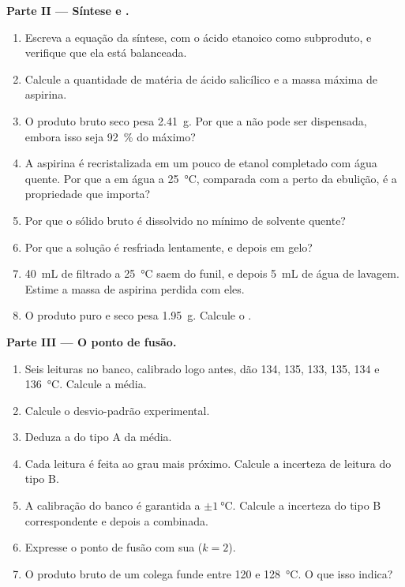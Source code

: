 \begin{problem}
\noindent\textbf{Parte II --- Síntese e .}
\begin{enumerate}[resume]
  \item Escreva a equação da síntese, com o ácido etanoico 
        como subproduto, e verifique que ela está balanceada.
  \item Calcule a quantidade de matéria de ácido salicílico e a massa
        máxima de aspirina.
  \item O produto bruto seco pesa \qty{2.41}{g}. Por que a
         não pode ser dispensada, embora isso seja
        \qty{92}{\percent} do máximo?
  \item A aspirina é recristalizada em um pouco de etanol completado com
        água quente. Por que a  em água a \qty{25}{\celsius},
        comparada com a  perto da ebulição, é a propriedade que importa?
  \item Por que o sólido bruto é dissolvido no mínimo de solvente quente?
  \item Por que a solução é resfriada lentamente, e depois em gelo?
  \item \qty{40}{mL} de filtrado a \qty{25}{\celsius} saem do funil, e
        depois \qty{5}{mL} de água de lavagem. Estime a massa de aspirina
        perdida com eles.
  \item O produto puro e seco pesa \qty{1.95}{g}. Calcule o .
\end{enumerate}

\noindent\textbf{Parte III --- O ponto de fusão.}
\begin{enumerate}[resume]
  \item Seis leituras no banco, calibrado logo antes, dão 134, 135,
        133, 135, 134 e \qty{136}{\celsius}. Calcule a média.
  \item Calcule o desvio-padrão experimental.
  \item Deduza a  do tipo A da média.
  \item Cada leitura é feita ao grau mais próximo. Calcule a incerteza de
        leitura do tipo B.
  \item A calibração do banco é garantida a
        $\pm\qty{1}{\celsius}$. Calcule a incerteza do tipo B
        correspondente e depois a  combinada.
  \item Expresse o ponto de fusão com sua  ($k = 2$).
  \item O produto bruto de um colega funde entre 120 e
        \qty{128}{\celsius}. O que isso indica?
\end{enumerate}


\end{problem}
